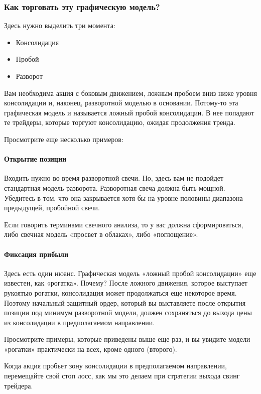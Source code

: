 \documentclass{book}
\begin{document}
\subsubsection{Как торговать эту графическую модель?}

Здесь нужно выделить три момента:
\begin{itemize}
\item     Консолидация
\item     Пробой
\item     Разворот
\end{itemize}

Вам необходима акция с боковым движением, ложным пробоем вниз ниже уровня консолидации и, наконец, разворотной моделью в основании. Потому-то эта графическая модель и называется ложный пробой консолидации. В нее попадают те трейдеры, которые торгуют консолидацию, ожидая продолжения тренда.

Просмотрите еще несколько примеров:

\paragraph{Открытие позиции}

Входить нужно во время разворотной свечи. Но, здесь вам не подойдет стандартная модель разворота. Разворотная свеча должна быть мощной. Убедитесь в том, что она закрывается хотя бы на уровне половины диапазона предыдущей, пробойной свечи.

Если говорить терминами свечного анализа, то у вас должна
сформироваться, либо свечная модель «просвет в облаках», либо
«поглощение».

\paragraph{Фиксация прибыли}

Здесь есть один нюанс. Графическая модель «ложный пробой консолидации» еще известен, как «рогатка». Почему? После ложного движения, которое выступает рукоятью рогатки, консолидация может продолжаться еще некоторое время. Поэтому начальный защитный ордер, который вы выставляете после открытия позиции под минимум разворотной модели, должен сохраняться до выхода цены из консолидации в предполагаемом направлении.

Просмотрите примеры, которые приведены выше еще раз, и вы увидите модели «рогатки» практически на всех, кроме одного (второго).

Когда акция пробьет зону консолидации в предполагаемом направлении,
перемещайте свой стоп лосс, как мы это делаем при стратегии выхода
свинг трейдера.
\end{document}
